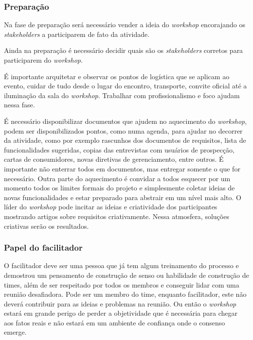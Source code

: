       \subsubsection{Preparação}
	
	Na fase de preparação será necessário vender a ideia do \textit{workshop} encorajando os \textit{stakeholders} 
	a participarem de fato da atividade.
	
	Ainda na preparação é necessário decidir quais são os \textit{stakeholders} corretos para participarem do \textit{workshop}.
	
	É importante arquitetar e observar os pontos de logística que se aplicam ao evento, 
	cuidar de tudo desde o lugar do encontro, transporte, convite oficial até a iluminação da sala do \textit{workshop}. 
	Trabalhar com profissionalismo e foco ajudam nessa fase.
	
	É necessário disponibilizar documentos que ajudem no aquecimento do \textit{workshop}, 
	podem ser disponibilizados pontos, como numa agenda, para ajudar no decorrer da atividade, 
	como por exemplo rascunhos dos documentos de requisitos, lista de funcionalidades sugeridas, 
	copias das entrevistas com usuários de prospecção, cartas de consumidores, novas diretivas de gerenciamento, 
	entre outros. É importante não enterrar todos em documentos, mas entregar somente o que for necessário. 
	Outra parte do aquecimento é convidar a todos esquecer por um momento todos os limites formais do projeto 
	e simplesmente coletar ideias de novas funcionalidades e estar preparado para abstrair em um nível mais alto. 
	O líder do \textit{workshop} pode incitar as ideias e criatividade dos participantes mostrando artigos sobre requisitos 
	criativamente. 
	Nessa atmosfera, soluções criativas serão os resultados.
      
      \subsubsection{Papel do facilitador}
	
	O facilitador deve ser uma pessoa que já tem algum treinamento do processo e demostrou um pensamento 
	de construção de senso ou habilidade de construção de times, 
	além de ser respeitado por todos os membros e conseguir lidar com uma reunião desafiadora. 
	Pode ser um membro do time, enquanto facilitador, este não deverá contribuir para as ideias e problemas na reunião. 
	Ou então o \textit{workshop} estará em grande perigo de perder a objetividade que é necessária para chegar aos fatos reais
	e não estará em um ambiente de confiança onde o consenso emerge.
	
